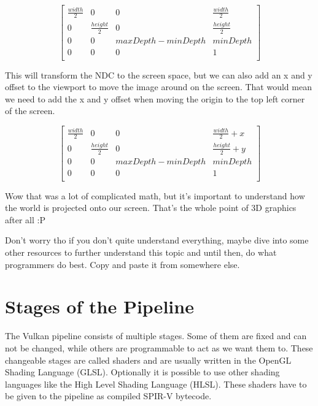 \documentclass[12pt]{report} \usepackage{preamble}
\begin{document}
\[
	\begin{bmatrix}
		\frac{width}{2} & 0                & 0                   & \frac{width}{2}  \\
		0               & \frac{height}{2} & 0                   & \frac{height}{2} \\
		0               & 0                & maxDepth - minDepth & minDepth         \\
		0               & 0                & 0                   & 1                \\
	\end{bmatrix}
\]

This will transform the NDC to the screen space, but we can also add an x
and y offset to the viewport to move the image around on the screen.
That would mean we need to add the x and y offset when moving
the origin to the top left corner of the screen.

\[
	\begin{bmatrix}
		\frac{width}{2} & 0                & 0                   & \frac{width}{2} + x  \\
		0               & \frac{height}{2} & 0                   & \frac{height}{2} + y \\
		0               & 0                & maxDepth - minDepth & minDepth             \\
		0               & 0                & 0                   & 1                    \\
	\end{bmatrix}
\]

Wow that was a lot of complicated math, but it's important to understand how the world is
projected onto our screen. That's the whole point of 3D graphics after all :P

Don't worry tho if you don't quite understand everything, maybe dive into some other resources to further
understand this topic and until then, do what programmers do best. Copy and paste it from somewhere else.

\section{Stages of the Pipeline}

The Vulkan pipeline consists of multiple stages. Some of them are fixed
and can not be changed, while others are programmable to act as we
want them to. These changeable stages are called shaders and are usually
written in the OpenGL Shading Language (GLSL). Optionally it is possible
to use other shading languages like the High Level Shading Language (HLSL).
These shaders have to be given to the pipeline as compiled SPIR-V bytecode. \cite{spirv}
\end{document}
